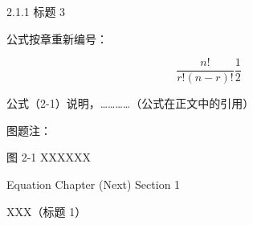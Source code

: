 \documentclass[UTF8, scheme=chinese, openany, oneside]{ctexbook}
\begin{document}

\vspace{0.3cm}
\noindent \hspace{2em} { 2.1.1 \quad 标题 3}

\vspace{1.2cm}

\noindent \hspace{2em} 公式按章重新编号：

\vspace{0.6cm}

\begin{equation}
    \frac{n!}{r!(n-r)!} \frac{1}{2} \tag{2-1} \label{eq:2-1}
\end{equation}

\vspace{1.8cm}

\noindent \hspace{2em} 公式（2-1）说明，…………（公式在正文中的引用）

\vspace{3.5cm}

\noindent \hspace{2em} 图题注：

\vspace{0.8cm}

\begin{center}
     图 2-1 \quad XXXXXX
\end{center}

\newpage
{}
\vspace*{5cm}
\begin{center}
    {\color{white} Equation Chapter (Next) Section 1}
\end{center}

\clearpage
\setcounter{chapter}{2} %
\setcounter{page}{8}    %


\vspace{1cm}
\begin{center}
    { \quad XXX（标题 1）}
\end{center}
\vspace{0.8cm}
\end{document}
